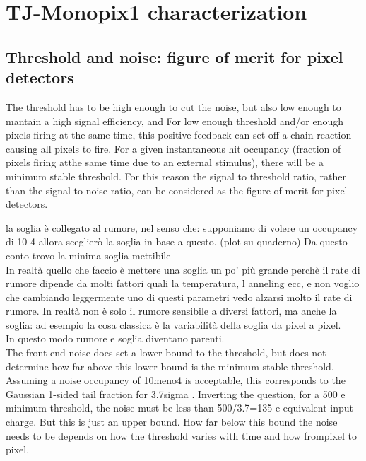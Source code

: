 
\section{TJ-Monopix1 characterization}
    \subsection{Threshold and noise: figure of merit for pixel detectors}
 
        The threshold has to be high enough to cut the noise, but also low enough to mantain a high signal efficiency, and 
        For low enough threshold and/or enough pixels firing at the same time, this positive feedback can set off a chain reaction causing all pixels to fire. For a given instantaneous hit occupancy (fraction of pixels firing atthe same time due to an external stimulus), there will be a minimum stable threshold.
        For this reason the signal to threshold ratio, rather than the signal to noise ratio, can be considered as the figure of merit for pixel detectors.


        la soglia è collegato al rumore, nel senso che: supponiamo di volere un occupancy di 10-4
        allora sceglierò la soglia in base a questo. (plot su quaderno)
        Da questo conto trovo la minima soglia mettibile\\
        In realtà quello che faccio è mettere una soglia un po' più grande perchè il rate di rumore
        dipende da molti fattori quali la temperatura, l anneling ecc, e non voglio che cambiando leggermente
        uno di questi parametri vedo alzarsi molto il rate di rumore. In realtà non è solo il
        rumore sensibile a diversi fattori, ma anche la soglia: ad esempio la cosa classica è
        la variabilità della soglia da pixel a pixel.\\
        In questo modo rumore e soglia diventano parenti.\\

        The front end noise does set a lower bound to the threshold, but does not determine how far above this lower bound is the minimum stable threshold. Assuming a noise occupancy of 10meno4 is acceptable, this corresponds to the Gaussian 1-sided tail fraction for 3.7sigma . Inverting the question, for a 500 e minimum threshold, the noise must be less than 500/3.7=135 e equivalent input charge. But this is just an upper bound. How far below this bound the noise needs to be depends on how the threshold varies with time and how frompixel to pixel.

